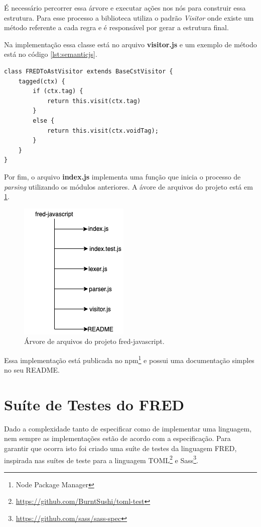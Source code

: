 É necessário percorrer essa árvore e executar ações nos nós para construir essa estrutura.
Para esse processo a biblioteca utiliza o padrão \textit{Visitor} onde existe um método referente
a cada regra e é responsável por gerar a estrutura final.

Na implementação essa classe está no arquivo \textbf{visitor.js} e um exemplo de método 
está no código \ref{lst:semanticjs}.

\begin{lstlisting}[caption=Exemplo de ação semântica,label={lst:semanticjs}]
class FREDToAstVisitor extends BaseCstVisitor {
    tagged(ctx) {
        if (ctx.tag) {
            return this.visit(ctx.tag)
        }
        else {
            return this.visit(ctx.voidTag);
        }
    }
}
\end{lstlisting}

Por fim, o arquivo \textbf{index.js} implementa uma função que inicia o processo de 
\textit{parsing} utilizando os módulos anteriores. A ávore de arquivos do projeto está
em \ref{fig:filetreejs}.

\begin{figure}[h]
	\centering
	\includegraphics[keepaspectratio=true,scale=0.7]{figuras/jstree.png}
	\caption{Árvore de arquivos do projeto fred-javascript.}
	\label{fig:filetreejs}
\end{figure}

Essa implementação está publicada no npm\footnote{Node Package Manager} e possui uma
documentação simples no seu README.

\section{Suíte de Testes do FRED}

Dado a complexidade tanto de especificar como de implementar uma linguagem, nem sempre 
as implementações estão de acordo com a especificação. Para garantir que ocorra isto foi criado
uma suíte de testes da linguagem FRED, inspirada nas suítes de teste
para a linguagem TOML\footnote{\url{https://github.com/BurntSushi/toml-test}}
e Sass\footnote{\url{https://github.com/sass/sass-spec}}.

